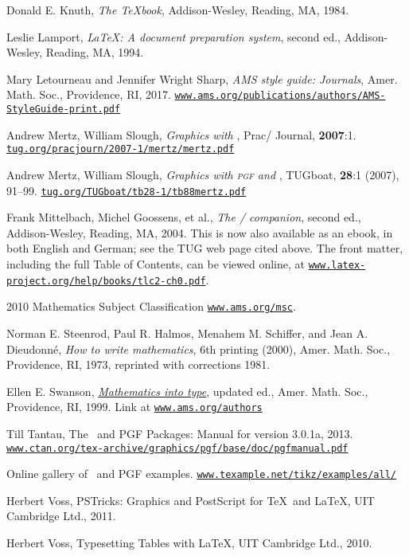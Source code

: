 \begin{thebibliography}{[ASMR]}
 Donald E. Knuth, \textit{The \TeX book},
Addison-Wesley, Reading, MA, 1984.

 Leslie Lamport, \textit{\LaTeX{\textup:} A document
preparation system}, second ed., Addison-Wesley, Reading, MA, 1994.

 Mary Letourneau and Jennifer Wright Sharp,
\textit{AMS style guide: Journals}, Amer. Math. Soc., Providence, RI, 2017.
\href{http://www.ams.org/publications/authors/AMS-StyleGuide-print.pdf}{\texttt{www.ams.org/publications/authors/AMS-StyleGuide-print.pdf}}

Andrew Mertz, William Slough,
\emph{Graphics with \TikZ},
Prac\tex/ Journal, \textbf{2007}:1.
\href{http://tug.org/pracjourn/2007-1/mertz/mertz.pdf}{\texttt{tug.org/pracjourn/2007-1/mertz/mertz.pdf}}

Andrew Mertz, William Slough,
\emph{Graphics with \textsc{pgf} and \TikZ},
TUGboat, \textbf{28}:1 (2007), 91--99.
\href{http://tug.org/TUGboat/tb28-1/tb88mertz.pdf}{\texttt{tug.org/TUGboat/tb28-1/tb88mertz.pdf}}

 Frank Mittelbach, Michel Goossens, et al.,
\textit{The \latex/ companion}, second ed., Addison-Wesley, Reading,
MA, 2004.  This is now also available as an ebook, in both English and
German; see the TUG web page cited above.  The front matter, including
the full Table of Contents, can be viewed online, at
\href{https://www.latex-project.org/help/books/tlc2-ch0.pdf}{\texttt{www.latex-project.org/help/books/tlc2-ch0.pdf}}.

2010 Mathematics Subject Classification
\href{http://www.ams.org/msc}{\texttt{www.ams.org/msc}}.

Norman E. Steenrod, Paul R. Halmos, Menahem M. Schiffer, and Jean A.
Dieudonn\'e, \textit{How to write mathematics}, 6th printing (2000),
Amer. Math. Soc., Providence, RI, 1973, reprinted with corrections 1981.

 Ellen E. Swanson, 
\href{http://www.ams.org/publications/authors/mit-2.pdf}
{\textit{Mathematics into type}},
updated ed., Amer. Math. Soc., Providence, RI, 1999.  Link at
\href{http://www.ams.org/publications/authors}{\texttt{www.ams.org/authors}}

Till Tantau,
The \TikZ\ and PGF Packages: Manual for version 3.0.1a, 
2013.
\href{http://www.ctan.org/tex-archive/graphics/pgf/base/doc/pgfmanual.pdf}{\texttt{www.ctan.org/tex-archive/graphics/pgf/base/doc/pgfmanual.pdf}}

Online gallery of \TikZ\ and PGF examples.
\href{http://www.texample.net/tikz/examples/all/}{\texttt{www.texample.net/tikz/examples/all/}}

Herbert Voss,
PSTricks: Graphics and PostScript for \TeX\ and \LaTeX,
UIT Cambridge Ltd.,
2011.

Herbert Voss,
Typesetting Tables with \LaTeX,
UIT Cambridge Ltd.,
2010.

\end{thebibliography}

\endinput
